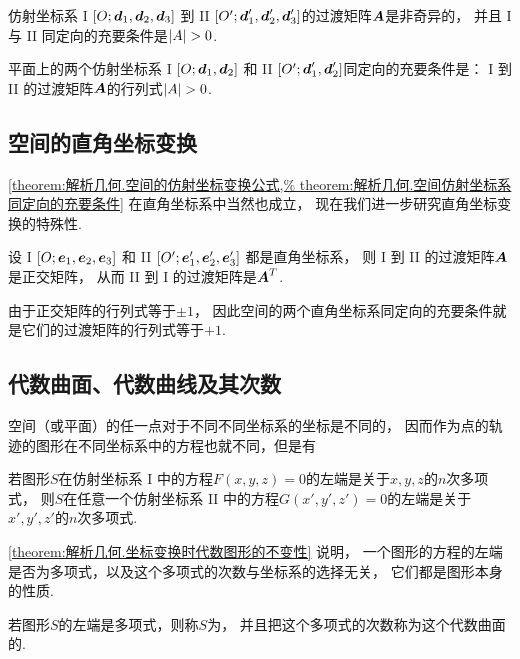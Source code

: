 \begin{theorem}\label{theorem:解析几何.空间仿射坐标系同定向的充要条件}
仿射坐标系 I \([O;\boldsymbol{d}_1,\boldsymbol{d}_2,\boldsymbol{d}_3]\)
到 II \([O';\boldsymbol{d}_1',\boldsymbol{d}_2',\boldsymbol{d}_3']\)的过渡矩阵\(\boldsymbol{A}\)是非奇异的，
并且 I 与 II 同定向的充要条件是\(\abs{A}>0\).
\end{theorem}

\begin{corollary}
平面上的两个仿射坐标系 I \([O;\boldsymbol{d}_1,\boldsymbol{d}_2]\)
和 II \([O';\boldsymbol{d}_1',\boldsymbol{d}_2']\)同定向的充要条件是：
I 到 II 的过渡矩阵\(\boldsymbol{A}\)的行列式\(\abs{A}>0\).
\end{corollary}

\subsection{空间的直角坐标变换}
\cref{theorem:解析几何.空间的仿射坐标变换公式,%
theorem:解析几何.空间仿射坐标系同定向的充要条件}
在直角坐标系中当然也成立，
现在我们进一步研究直角坐标变换的特殊性.

\begin{theorem}
设 I \([O;\boldsymbol{e}_1,\boldsymbol{e}_2,\boldsymbol{e}_3]\)
和 II \([O';\boldsymbol{e}_1',\boldsymbol{e}_2',\boldsymbol{e}_3']\)
都是直角坐标系，
则 I 到 II 的过渡矩阵\(\boldsymbol{A}\)是正交矩阵，
从而 II 到 I 的过渡矩阵是\(\boldsymbol{A}^T\).
\end{theorem}

由于正交矩阵的行列式等于\(\pm1\)，
因此空间的两个直角坐标系同定向的充要条件就是它们的过渡矩阵的行列式等于\(+1\).

\subsection{代数曲面、代数曲线及其次数}
空间（或平面）的任一点对于不同不同坐标系的坐标是不同的，
因而作为点的轨迹的图形在不同坐标系中的方程也就不同，但是有
\begin{theorem}\label{theorem:解析几何.坐标变换时代数图形的不变性}
若图形\(S\)在仿射坐标系 I 中的方程\(F(x,y,z)=0\)的左端是关于\(x,y,z\)的\(n\)次多项式，
则\(S\)在任意一个仿射坐标系 II 中的方程\(G(x',y',z')=0\)的左端是关于\(x',y',z'\)的\(n\)次多项式.
\end{theorem}
\cref{theorem:解析几何.坐标变换时代数图形的不变性} 说明，
一个图形的方程的左端是否为多项式，以及这个多项式的次数与坐标系的选择无关，
它们都是图形本身的性质.

若图形\(S\)的左端是多项式，则称\(S\)为，
并且把这个多项式的次数称为这个代数曲面的.

